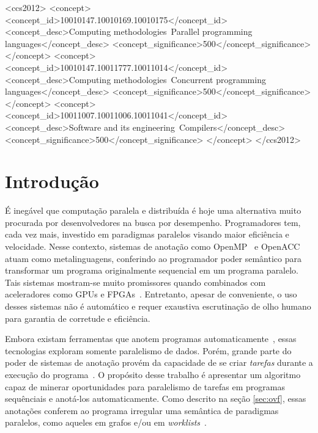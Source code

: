 \documentclass[sigplan,10pt]{acmart}
\begin{document}
 \begin{CCSXML}
<ccs2012>
<concept>
<concept_id>10010147.10010169.10010175</concept_id>
<concept_desc>Computing methodologies~Parallel programming languages</concept_desc>
<concept_significance>500</concept_significance>
</concept>
<concept>
<concept_id>10010147.10011777.10011014</concept_id>
<concept_desc>Computing methodologies~Concurrent programming languages</concept_desc>
<concept_significance>500</concept_significance>
</concept>
<concept>
<concept_id>10011007.10011006.10011041</concept_id>
<concept_desc>Software and its engineering~Compilers</concept_desc>
<concept_significance>500</concept_significance>
</concept>
</ccs2012>
\end{CCSXML}


\maketitle

\section{Introdu\c{c}\~{a}o}
\label{sec:intro}

É inegável que computação paralela e distribuída é hoje uma alternativa muito procurada por 
desenvolvedores na busca por desempenho. Programadores tem, cada vez mais, investido
em paradigmas paralelos visando maior eficiência e velocidade. Nesse contexto, sistemas de
anotação como OpenMP~\cite{JaegerCP15} e
OpenACC~\cite{OpenACC20} atuam como metalinguagens, conferindo ao programador
poder semântico para transformar um programa originalmente sequencial
em um programa paralelo. Tais sistemas mostram-se muito promissores quando
combinados com aceleradores como GPUs e FPGAs~\cite{Mendonca17,Poesia17}.
Entretanto, apesar de conveniente, o uso desses sistemas não é automático e
requer exaustiva escrutinação de olho humano para garantia de corretude e eficiência.

Embora existam ferramentas que anotem programas automaticamente~\cite{Mendonca16,Pingali11},
essas tecnologias exploram somente paralelismo de dados.  Porém, grande
parte do poder de sistemas de anotação provém da capacidade de se criar \textit{tarefas}
durante a execução do programa~\cite{Ayguade09}. O propósito desse trabalho
é apresentar um algoritmo capaz de minerar oportunidades para paralelismo de tarefas
em programas sequênciais e anotá-los automaticamente. Como descrito na seção \ref{sec:ovf},
essas anotações conferem ao programa irregular uma semântica de paradigmas paralelos,
como aqueles em grafos e/ou em \textit{worklists}~\cite{Pingali11}.
\end{document}
